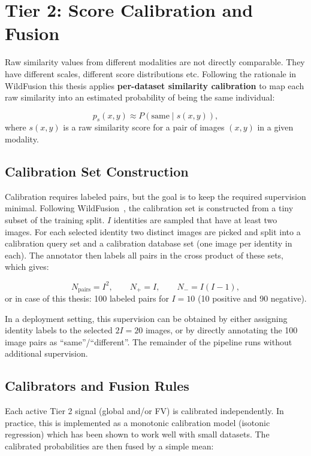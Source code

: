\section{Tier 2: Score Calibration and Fusion}
Raw similarity values from different modalities are not directly comparable. They have different scales, different score distributions etc. Following the rationale in WildFusion\cite{cermak2024wildfusionindividualanimalidentification} this thesis applies \textbf{per-dataset similarity calibration} to map each raw similarity into an estimated probability of being the same individual:

\begin{equation}
    p_s(x,y) \approx P(\text{same} \mid s(x,y)),
\end{equation}
where $s(x,y)$ is a raw similarity score for a pair of images $(x,y)$ in a given modality.

\subsection{Calibration Set Construction}
Calibration requires labeled pairs, but the goal is to keep the required supervision minimal. Following WildFusion~\cite{cermak2024wildfusionindividualanimalidentification}, the calibration set is constructed from a tiny subset of the training split. \(I\) identities are sampled that have at least two images. For each selected identity two distinct images are picked and split into a calibration query set and a calibration database set (one image per identity in each). The annotator then labels all pairs in the cross product of these sets, which gives:

\[
N_{\text{pairs}} = I^2,\qquad N_{+}=I,\qquad N_{-}=I(I-1),
\]
or in case of this thesis: \num{100} labeled pairs for \(I=\num{10}\) (10 positive and 90 negative).

In a deployment setting, this supervision can be obtained by either assigning identity labels to the selected \(2I=\num{20}\) images, or by directly annotating the \num{100} image pairs as ``same''/``different''. The remainder of the pipeline runs without additional supervision.

\subsection{Calibrators and Fusion Rules}
Each active Tier 2 signal (global and/or FV) is calibrated independently. In practice, this is implemented as a monotonic calibration model (isotonic regression) which has been shown to work well with small datasets\cite{cermak2024wildfusionindividualanimalidentification}. The calibrated probabilities are then fused by a simple mean:

